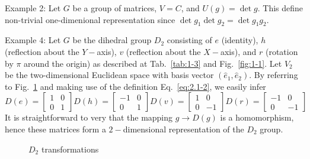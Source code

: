 \textrm{Example 2}: Let $G$ be a group of matrices, $V=C$, and $U\left(g\right) =\det g$.
This define non-trivial one-dimenional representation since $\det g_{1} \det g_{2} = \det g_{1}g_{2}$.

\textrm{Example 4}: Let $G$ be the dihedral group $D_{2}$ consisting of $e$ (identity), $h$ (reflection about the $Y-$axis), $v$ (reflection about the $X-$axis), and $r$ (rotation by $\pi$ around the origin) as described at Tab.~\ref{tab:1-3} and Fig.~\ref{fig:1-1}.
Let $V_{2}$ be the two-dimensional Euclidean space with basis vector $\left(\hat{e}_{1}, \hat{e}_{2}\right)$.
By referring to Fig.~\ref{fig:2-1} and making use of the definition Eq.~\eqref{eq:2.1-2}, we easily infer
\begin{equation}
  \label{eq:2.1-4}
  D\left(e\right) =
  \begin{bmatrix}
    1 & 0 \\
    0 & 1
  \end{bmatrix}
  D\left(h\right) =
  \begin{bmatrix}
    -1 & 0 \\
    0 & 1
  \end{bmatrix}
  D\left(v\right) =
  \begin{bmatrix}
    1 & 0 \\
    0 & -1
  \end{bmatrix}
  D\left(r\right) =
  \begin{bmatrix}
    -1 & 0 \\
    0 & -1
  \end{bmatrix}
\end{equation}
It is straightforward to very that the mapping $g\longrightarrow D\left(g\right)$ is a homomorphism, hence these matrices form a $2-$dimensional representation of the $D_{2}$ group.
\begin{figure}
  \centering
  \caption{$D_2$ transformations}
  \label{fig:2-1}
\end{figure}

